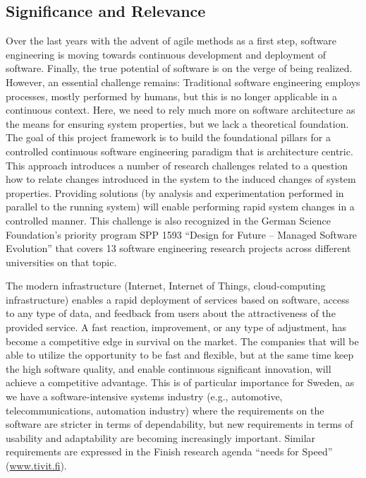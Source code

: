 \documentclass[12pt]{article}
\begin{document}
\vspace{-.3cm}

\subsection{Significance and Relevance}
\vspace{-.2cm}

Over the last years with the advent of agile methods as a first step, software engineering is moving towards continuous development and deployment of software. Finally, the true potential of software is on the verge of being realized. However, an essential challenge remains: Traditional software engineering employs processes, mostly performed by humans, but this is no longer applicable in a continuous context. Here, we need to rely much more on software architecture as the means for ensuring system properties, but we lack a theoretical foundation. The goal of this project framework is to build the foundational pillars for a controlled continuous software engineering paradigm that is architecture centric. This approach introduces a number of research challenges related to a question how to relate changes introduced in the system to the induced changes of system properties. Providing solutions (by analysis and experimentation performed in parallel to the running system) will enable performing rapid system changes in a controlled manner. This challenge is also recognized in the German Science Foundation's priority program SPP 1593 ``Design for Future – Managed Software Evolution'' that covers 13 software engineering research projects across different universities on that topic.


The modern infrastructure (Internet, Internet of Things, cloud-computing infrastructure) enables a rapid deployment of services based on software, access to any type of data, and feedback from users about the attractiveness of the provided service. A fast reaction, improvement, or any type of adjustment, has become a competitive edge in survival on the market. The companies that will be able to utilize the opportunity to be fast and flexible, but at the same time keep the high software quality, and enable continuous significant innovation, will achieve a competitive advantage. This is of particular importance for Sweden, as we have a software-intensive systems industry (e.g., automotive, telecommunications, automation industry) where the requirements on the software are stricter in terms of dependability, but new requirements in terms of usability and adaptability are becoming increasingly important. Similar requirements are expressed in the Finish research agenda ``needs for Speed'' ({\small \url{www.tivit.fi}}).
\end{document}
